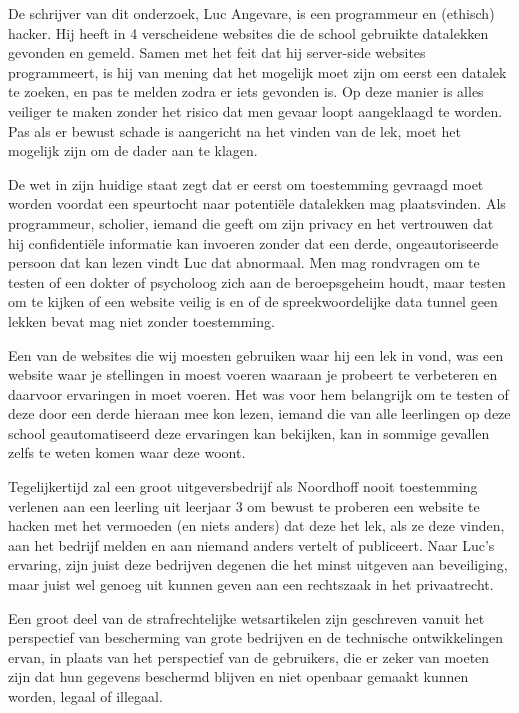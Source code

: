 \documentclass[
]{article}
\begin{document}
De schrijver van dit onderzoek, Luc Angevare, is een programmeur en
(ethisch) hacker. Hij heeft in 4 verscheidene websites die de school
gebruikte datalekken gevonden en gemeld. Samen met het feit dat hij
server-side websites programmeert, is hij van mening dat het mogelijk
moet zijn om eerst een datalek te zoeken, en pas te melden zodra er iets
gevonden is. Op deze manier is alles veiliger te maken zonder het risico
dat men gevaar loopt aangeklaagd te worden. Pas als er bewust schade is
aangericht na het vinden van de lek, moet het mogelijk zijn om de dader
aan te klagen.

De wet in zijn huidige staat zegt dat er eerst om toestemming gevraagd
moet worden voordat een speurtocht naar potentiële datalekken mag
plaatsvinden. Als programmeur, scholier, iemand die geeft om zijn
privacy en het vertrouwen dat hij confidentiële informatie kan invoeren
zonder dat een derde, ongeautoriseerde persoon dat kan lezen vindt Luc
dat abnormaal. Men mag rondvragen om te testen of een dokter of
psycholoog zich aan de beroepsgeheim houdt, maar testen om te kijken of
een website veilig is en of de spreekwoordelijke data tunnel geen lekken
bevat mag niet zonder toestemming.

Een van de websites die wij moesten gebruiken waar hij een lek in vond,
was een website waar je stellingen in moest voeren waaraan je probeert
te verbeteren en daarvoor ervaringen in moet voeren. Het was voor hem
belangrijk om te testen of deze door een derde hieraan mee kon lezen,
iemand die van alle leerlingen op deze school geautomatiseerd deze
ervaringen kan bekijken, kan in sommige gevallen zelfs te weten komen
waar deze woont.

Tegelijkertijd zal een groot uitgeversbedrijf als Noordhoff nooit
toestemming verlenen aan een leerling uit leerjaar 3 om bewust te
proberen een website te hacken met het vermoeden (en niets anders) dat
deze het lek, als ze deze vinden, aan het bedrijf melden en aan niemand
anders vertelt of publiceert. Naar Luc's ervaring, zijn juist deze
bedrijven degenen die het minst uitgeven aan beveiliging, maar juist wel
genoeg uit kunnen geven aan een rechtszaak in het privaatrecht.

Een groot deel van de strafrechtelijke wetsartikelen zijn geschreven
vanuit het perspectief van bescherming van grote bedrijven en de
technische ontwikkelingen ervan, in plaats van het perspectief van de
gebruikers, die er zeker van moeten zijn dat hun gegevens beschermd
blijven en niet openbaar gemaakt kunnen worden, legaal of illegaal.
\end{document}
